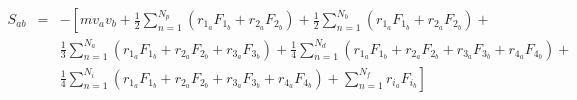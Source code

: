 \documentclass[12pt]{article}
\begin{document}
\begin{eqnarray*}
S_{ab} & = & - \left[ m v_a v_b + 
   \frac{1}{2} \sum_{n = 1}^{N_p} (r_{1_a} F_{1_b} + r_{2_a} F_{2_b}) +
   \frac{1}{2} \sum_{n = 1}^{N_b} (r_{1_a} F_{1_b} + r_{2_a} F_{2_b}) + \right. \\
&& \left. \frac{1}{3} \sum_{n = 1}^{N_a} (r_{1_a} F_{1_b} + r_{2_a} F_{2_b} + 
                                           r_{3_a} F_{3_b}) + 
   \frac{1}{4} \sum_{n = 1}^{N_d} (r_{1_a} F_{1_b} + r_{2_a} F_{2_b} + 
				   r_{3_a} F_{3_b} + r_{4_a} F_{4_b}) + \right. \\
&& \left. \frac{1}{4} \sum_{n = 1}^{N_i} (r_{1_a} F_{1_b} + r_{2_a} F_{2_b} + 
                                          r_{3_a} F_{3_b} + r_{4_a} F_{4_b}) +
   \sum_{n = 1}^{N_f} r_{i_a} F_{i_b} \right]
\end{eqnarray*}
\end{document}

